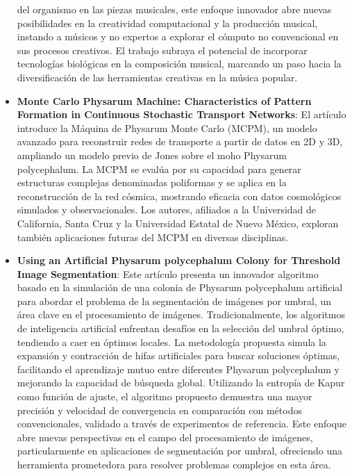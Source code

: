 \begin{itemize}
            del organismo en las piezas musicales, este enfoque innovador abre nuevas posibilidades en la creatividad computacional y la producci\'on musical, 
            instando a m\'usicos y no expertos a explorar el c\'omputo no convencional en sus procesos creativos. El trabajo subraya el potencial de incorporar 
            tecnolog\'ias biol\'ogicas en la composici\'on musical, marcando un paso hacia la diversificaci\'on de las herramientas creativas en la m\'usica popular. \cite{NIME20_98}
        \item \textbf{Monte Carlo Physarum Machine: Characteristics of Pattern Formation in Continuous Stochastic Transport Networks}: 
            El art\'iculo introduce la M\'aquina de Physarum Monte Carlo (MCPM), un modelo avanzado para reconstruir redes de transporte a partir 
            de datos en 2D y 3D, ampliando un modelo previo de Jones sobre el moho Physarum polycephalum. La MCPM se eval\'ua por su capacidad 
            para generar estructuras complejas denominadas poliformas y se aplica en la reconstrucci\'on de la red c\'osmica, mostrando eficacia 
            con datos cosmol\'ogicos simulados y observacionales. Los autores, afiliados a la Universidad de California, Santa Cruz y la Universidad 
            Estatal de Nuevo M\'exico, exploran tambi\'en aplicaciones futuras del MCPM en diversas disciplinas. \cite{Elek2022}
        \item \textbf{Using an Artificial Physarum polycephalum Colony for Threshold Image Segmentation}: Este art\'iculo presenta un innovador 
            algoritmo basado en la simulaci\'on de una colonia de Physarum polycephalum artificial para abordar el problema de la segmentaci\'on de 
            im\'agenes por umbral, un \'area clave en el procesamiento de im\'agenes. Tradicionalmente, los algoritmos de inteligencia artificial 
            enfrentan desaf\'ios en la selecci\'on del umbral \'optimo, tendiendo a caer en \'optimos locales. La metodolog\'ia propuesta simula la 
            expansi\'on y contracci\'on de hifas artificiales para buscar soluciones \'optimas, facilitando el aprendizaje mutuo entre diferentes 
            Physarum polycephalum y mejorando la capacidad de b\'usqueda global. Utilizando la entrop\'ia de Kapur como funci\'on de ajuste, el 
            algoritmo propuesto demuestra una mayor precisi\'on y velocidad de convergencia en comparaci\'on con m\'etodos convencionales, validado 
            a trav\'es de experimentos de referencia. Este enfoque abre nuevas perspectivas en el campo del procesamiento de im\'agenes, 
            particularmente en aplicaciones de segmentaci\'on por umbral, ofreciendo una herramienta prometedora para resolver problemas complejos en esta \'area. \cite{Cai2023}
    \end{itemize}
